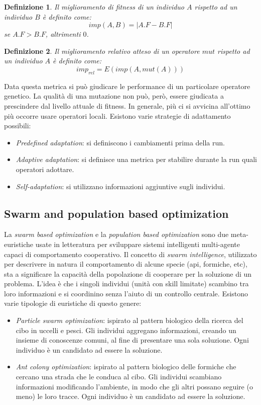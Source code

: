 \documentclass[10pt,a4paper]{article}
\newtheorem{definition}{Definizione}
\begin{document}
\begin{definition}
Il \emph{miglioramento di fitness} di un individuo $A$ rispetto ad un individuo $B$ è definito come:
$$
imp(A,B) = |A.F - B.F|
$$ 
se $A.F > B.F$, altrimenti $0$.
\end{definition}

\begin{definition}
Il \emph{miglioramento relativo atteso} di un operatore $mut$ rispetto ad un individuo $A$ è definito come:
$$
imp_{rel} = E(imp(A,mut(A)))
$$ 
\end{definition}

Data questa metrica si può giudicare le performance di un particolare operatore genetico. La qualità di una mutazione non può, però, essere giudicata a prescindere dal livello attuale di fitness. In generale, più ci si avvicina all'ottimo più occorre usare operatori locali. Esistono varie strategie di adattamento possibili:

\begin{itemize}
\item{\emph{Predefined adaptation}: si definiscono i cambiamenti prima della run.}
\item{\emph{Adaptive adaptation}: si definisce una metrica per stabilire durante la run quali operatori adottare.}
\item{\emph{Self-adaptation}: si utilizzano informazioni aggiuntive sugli individui.}
\end{itemize}

\subsection{Swarm and population based optimization}

La \emph{swarm based optimization} e la \emph{population based optimization} sono due meta-euristiche usate in letteratura per sviluppare sistemi intelligenti multi-agente capaci di  comportamento cooperativo. Il concetto di \emph{swarm intelligence}, utilizzato per descrivere in natura il comportamento di alcune specie (api, formiche, etc), sta a significare la capacità della popolazione di cooperare per la soluzione di un problema. L'idea è che i singoli individui (unità con skill limitate) scambino tra loro informazioni e si coordinino senza l'aiuto di un controllo centrale. Esistono varie tipologie di euristiche di questo genere:

\begin{itemize}
\item{\emph{Particle swarm optimization}: ispirato al pattern biologico della ricerca del cibo in uccelli e pesci. Gli individui aggregano informazioni, creando un insieme di conoscenze comuni, al fine di presentare una sola soluzione. Ogni individuo è un candidato ad essere la soluzione.}
\item{\emph{Ant colony optimization}: ispirato al pattern biologico delle formiche che cercano una strada che le conduca al cibo. Gli individui scambiano informazioni modificando l'ambiente, in modo che gli altri possano seguire (o meno) le loro tracce. Ogni individuo è un candidato ad essere la soluzione.}
\end{itemize}
\end{document}
